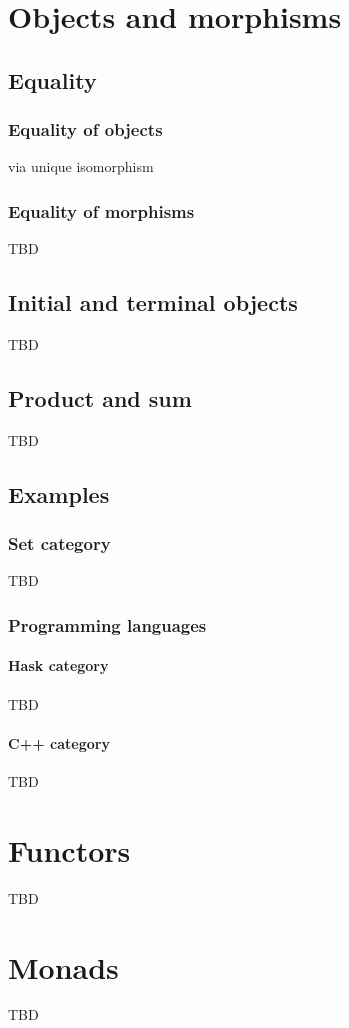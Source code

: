 \chapter{Objects and morphisms}

\section{Equality}

\subsection{Equality of objects}
via unique isomorphism

\subsection{Equality of morphisms}
TBD

\section{Initial and terminal objects}
TBD

\section{Product and sum}
TBD

\section{Examples}

\subsection{\textbf{Set} category}
TBD

\subsection{Programming languages}
\subsubsection{\textbf{Hask} category}
TBD
\subsubsection{\textbf{C++} category}
TBD


\chapter{Functors}

TBD

\chapter{Monads}

TBD
